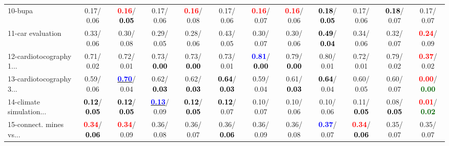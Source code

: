\begin{table}[h]
\begin{center}
{\begin{tabular}{lc|c|c|c|c|c|c|c|c|c|c}
10-bupa &   0.17/  0.06 & \textcolor{red}{\textbf{  0.16}}/\textcolor{black}{\textbf{  0.05}} &   0.17/  0.06 & \textcolor{red}{\textbf{  0.16}}/  0.08 &   0.17/  0.06 & \textcolor{red}{\textbf{  0.16}}/  0.07 & \textcolor{red}{\textbf{  0.16}}/  0.06 & \textcolor{black}{\textbf{  0.18}}/\textcolor{black}{\textbf{  0.05}} &   0.17/  0.06 & \textcolor{black}{\textbf{  0.18}}/  0.07 &   0.17/  0.07 \\
11-car evaluation &   0.33/  0.06 &   0.30/  0.08 &   0.29/  0.05 &   0.28/  0.06 &   0.43/  0.05 &   0.30/  0.07 &   0.30/  0.06 & \textcolor{black}{\textbf{  0.49}}/\textcolor{black}{\textbf{  0.04}} &   0.34/  0.06 &   0.32/  0.07 & \textcolor{red}{\textbf{  0.24}}/  0.09 \\
12-cardiotocography 1... &   0.71/  0.02 &   0.72/  0.01 &   0.73/\textcolor{black}{\textbf{  0.00}} &   0.73/\textcolor{black}{\textbf{  0.00}} &   0.73/  0.01 & \textcolor{blue}{\textbf{  0.81}}/\textcolor{black}{\textbf{  0.00}} &   0.79/\textcolor{black}{\textbf{  0.00}} &   0.80/  0.01 &   0.72/  0.01 &   0.79/  0.02 & \textcolor{red}{\textbf{  0.37}}/  0.02 \\
13-cardiotocography 3... &   0.59/  0.06 & \underline{\textcolor{blue}{\textbf{  0.70}}}/  0.04 &   0.62/\textcolor{black}{\textbf{  0.03}} &   0.62/\textcolor{black}{\textbf{  0.03}} & \textcolor{black}{\textbf{  0.64}}/\textcolor{black}{\textbf{  0.03}} &   0.59/  0.04 &   0.61/\textcolor{black}{\textbf{  0.03}} & \textcolor{black}{\textbf{  0.64}}/  0.04 &   0.60/  0.05 &   0.60/  0.07 & \textcolor{red}{\textbf{  0.00}}/\textcolor{darkgreen}{\textbf{  0.00}} \\
14-climate simulation... & \textcolor{black}{\textbf{  0.12}}/\textcolor{black}{\textbf{  0.05}} & \textcolor{black}{\textbf{  0.12}}/\textcolor{black}{\textbf{  0.05}} & \underline{\textcolor{blue}{\textbf{  0.13}}}/  0.09 & \textcolor{black}{\textbf{  0.12}}/\textcolor{black}{\textbf{  0.05}} & \textcolor{black}{\textbf{  0.12}}/  0.07 &   0.10/  0.07 &   0.10/  0.06 &   0.10/  0.06 &   0.11/\textcolor{black}{\textbf{  0.05}} &   0.08/\textcolor{black}{\textbf{  0.05}} & \textcolor{red}{\textbf{  0.01}}/\textcolor{darkgreen}{\textbf{  0.02}} \\ \hline
15-connect. mines vs... & \textcolor{red}{\textbf{  0.34}}/\textcolor{black}{\textbf{  0.06}} & \textcolor{red}{\textbf{  0.34}}/  0.09 &   0.36/  0.08 &   0.36/  0.07 &   0.36/\textcolor{black}{\textbf{  0.06}} &   0.36/  0.09 &   0.36/  0.08 & \textcolor{blue}{\textbf{  0.37}}/  0.07 & \textcolor{red}{\textbf{  0.34}}/\textcolor{black}{\textbf{  0.06}} &   0.35/  0.07 &   0.35/  0.07 \\

\end{tabular}}
\end{center}
\end{table}
